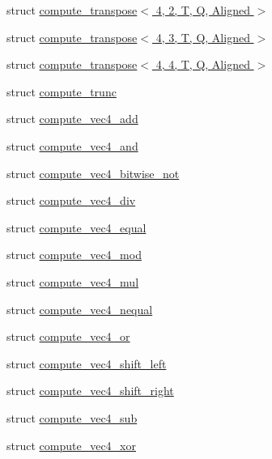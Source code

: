 \begin{DoxyCompactItemize}
\item 
struct \hyperlink{structglm_1_1detail_1_1compute__transpose_3_014_00_012_00_01_t_00_01_q_00_01_aligned_01_4}{compute\+\_\+transpose$<$ 4, 2, T, Q, Aligned $>$}
\item 
struct \hyperlink{structglm_1_1detail_1_1compute__transpose_3_014_00_013_00_01_t_00_01_q_00_01_aligned_01_4}{compute\+\_\+transpose$<$ 4, 3, T, Q, Aligned $>$}
\item 
struct \hyperlink{structglm_1_1detail_1_1compute__transpose_3_014_00_014_00_01_t_00_01_q_00_01_aligned_01_4}{compute\+\_\+transpose$<$ 4, 4, T, Q, Aligned $>$}
\item 
struct \hyperlink{structglm_1_1detail_1_1compute__trunc}{compute\+\_\+trunc}
\item 
struct \hyperlink{structglm_1_1detail_1_1compute__vec4__add}{compute\+\_\+vec4\+\_\+add}
\item 
struct \hyperlink{structglm_1_1detail_1_1compute__vec4__and}{compute\+\_\+vec4\+\_\+and}
\item 
struct \hyperlink{structglm_1_1detail_1_1compute__vec4__bitwise__not}{compute\+\_\+vec4\+\_\+bitwise\+\_\+not}
\item 
struct \hyperlink{structglm_1_1detail_1_1compute__vec4__div}{compute\+\_\+vec4\+\_\+div}
\item 
struct \hyperlink{structglm_1_1detail_1_1compute__vec4__equal}{compute\+\_\+vec4\+\_\+equal}
\item 
struct \hyperlink{structglm_1_1detail_1_1compute__vec4__mod}{compute\+\_\+vec4\+\_\+mod}
\item 
struct \hyperlink{structglm_1_1detail_1_1compute__vec4__mul}{compute\+\_\+vec4\+\_\+mul}
\item 
struct \hyperlink{structglm_1_1detail_1_1compute__vec4__nequal}{compute\+\_\+vec4\+\_\+nequal}
\item 
struct \hyperlink{structglm_1_1detail_1_1compute__vec4__or}{compute\+\_\+vec4\+\_\+or}
\item 
struct \hyperlink{structglm_1_1detail_1_1compute__vec4__shift__left}{compute\+\_\+vec4\+\_\+shift\+\_\+left}
\item 
struct \hyperlink{structglm_1_1detail_1_1compute__vec4__shift__right}{compute\+\_\+vec4\+\_\+shift\+\_\+right}
\item 
struct \hyperlink{structglm_1_1detail_1_1compute__vec4__sub}{compute\+\_\+vec4\+\_\+sub}
\item 
struct \hyperlink{structglm_1_1detail_1_1compute__vec4__xor}{compute\+\_\+vec4\+\_\+xor}
\item 

\end{DoxyCompactItemize}
